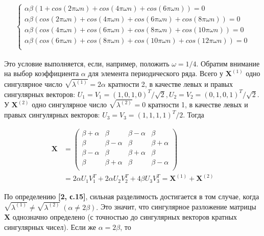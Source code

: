 \documentclass[
]{article}
\begin{document}
\begin{center}
\begin{align}
\begin{cases}
    \alpha\beta(1 + cos(2\pi \omega n) + cos(4 \pi \omega n) + cos(6\pi \omega n)) = 0 \\
    \alpha\beta(cos(2 \pi \omega n) + cos(4\pi \omega n) + cos(6 \pi \omega n) + cos(8\pi \omega n)) = 0 \\
    \alpha\beta(cos(4 \pi \omega n) + cos(6\pi \omega n) + cos(8 \pi \omega n) + cos(10\pi \omega n)) = 0 \\
    \alpha\beta(cos(6 \pi \omega n) + cos(8\pi \omega n) + cos(10 \pi \omega n) + cos(12\pi \omega n)) = 0 \\
\end{cases}
\end{align}
\end{center}

Это условие выполняется, если, например, положить \(\omega = 1/4\).
\newpage Обратим внимание на выбор коэффициента \(\alpha\) для элемента
периодического ряда. Всего у \(\textbf{X}^{(1)}\) одно сингулярное число
\(\sqrt{\lambda^{(1)}} = 2\alpha\) кратности 2, в качестве левых и
правых сингулярных векторов:
\(U_1 = V_1 = (1, 0, 1, 0)^T/\sqrt{2}, U_2 = V_2 = (0, 1, 0, 1)^T/\sqrt{2}.\)
У \(\textbf{X}^{(2)}\) одно сингулярное число
\(\sqrt{\lambda^{(2)}} = 0\) кратности 1, в качестве левых и правых
сингулярных векторов: \(U_3 = V_3 = (1, 1, 1, 1)^T/2.\) Тогда

\begin{align*}
    \textbf{X} & = 
    \begin{pmatrix}
        \beta + \alpha & \beta & \beta - \alpha & \beta \\
        \beta & \beta - \alpha & \beta & \beta + \alpha \\
        \beta - \alpha & \beta & \beta + \alpha & \beta \\
        \beta & \beta + \alpha & \beta & \beta - \alpha \\
    \end{pmatrix}
     \\ & = 2\alpha U_1V_1^T + 2\alpha U_2V_2^T + 4\beta U_3V_3^T = \textbf{X}^{(1)} + \textbf{X}^{(2)}
\end{align*}

По определению \textbf{[2, с.15]}, сильная разделимость достигается в
том случае, когда
\(\sqrt{\lambda^{(1)}} \not= \sqrt{\lambda^{(2)}} \ (\alpha \not = 2\beta).\)
Это значит, что сингулярное разложение матрицы \(\textbf{X}\) однозначно
определено (с точностью до сингулярных векторов кратных сингулярных
чисел). Если же \(\alpha = 2\beta\), то
\end{document}
